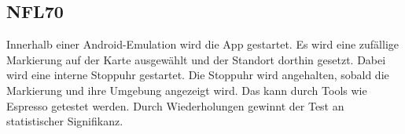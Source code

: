 \subsection*{NFL70}

Innerhalb einer Android-Emulation wird die App gestartet.
Es wird eine zufällige Markierung auf der Karte ausgewählt und der Standort dorthin gesetzt. 
Dabei wird eine interne Stoppuhr gestartet.
Die Stoppuhr wird angehalten, sobald die Markierung und ihre Umgebung angezeigt wird.
Das kann durch Tools wie Espresso getestet werden.
Durch Wiederholungen gewinnt der Test an statistischer Signifikanz.